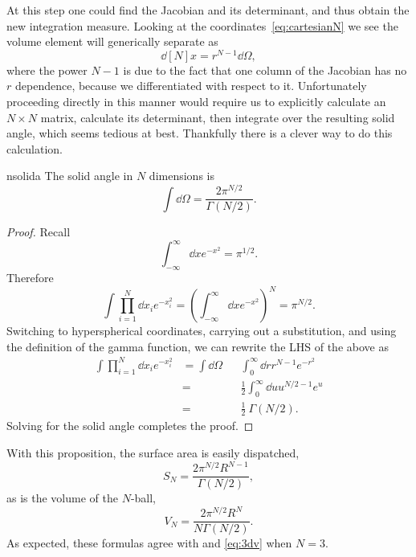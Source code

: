 At this step one could find the Jacobian and its determinant, and thus obtain
the new integration measure. Looking at the coordinates~\eqref{eq:cartesianN}
we see the volume element will generically separate as
\begin{equation}
  \dd[N]{x}=r^{N-1}\dd{\Omega},
\end{equation}
where the power $N-1$ is due to the fact that one column of the Jacobian has no
$r$ dependence, because we differentiated with respect to it. Unfortunately
proceeding directly in this manner would require us to explicitly calculate an
$N\times N$ matrix, calculate its determinant, then integrate over the
resulting solid angle, which seems tedious at best.
Thankfully there is a clever way to do this calculation. 

\begin{proposition}{}{nsolida}
The solid angle in $N$ dimensions is
$$
  \int\dd{\Omega}=\frac{2\pi^{N/2}}{\Gamma(N/2)}.
$$
\begin{proof}
  Recall 
  $$
    \int_{-\infty}^\infty\dd{x}e^{-x^2}=\pi^{1/2}.
  $$
  Therefore
  $$ 
    \int\prod_{i=1}^N\dd{x_i}e^{-x_i^2} 
      =\left(\int_{-\infty}^\infty\dd{x}e^{-x^2}\right)^N=\pi^{N/2}.
  $$
  Switching to hyperspherical coordinates, carrying out
  a substitution, and using the definition of the gamma function,
  we can rewrite the LHS of the above as
  \begin{equation*}\begin{aligned}
    \int\prod_{i=1}^N\dd{x_i}e^{-x_i^2}
       &=\int\dd{\Omega}&&\int_0^\infty\dd{r}r^{N-1}e^{-r^2}\\
       &=&&\frac{1}{2}\int_0^\infty\dd{u}u^{N/2-1}e^u\\
       &=&&\frac{1}{2}~\Gamma(N/2).
  \end{aligned}\end{equation*}
  Solving for the solid angle completes the proof. 
\end{proof}
\end{proposition}
With this proposition, the surface area is easily dispatched,
\begin{equation}
  S_N=\frac{2\pi^{N/2}R^{N-1}}{\Gamma(N/2)},
\end{equation}
as is the volume of the $N$-ball,
\begin{equation}
  V_N=\frac{2\pi^{N/2}R^N}{N\Gamma(N/2)}.
\end{equation}
As expected, these formulas agree with 
and \eqref{eq:3dv} when $N=3$.

